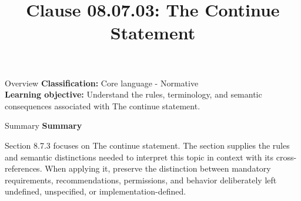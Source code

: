 \documentclass[10pt,letterpaper]{article}
\title{Clause 08.07.03: The Continue Statement}
\author{}
\date{}
\begin{document}
\maketitle
\begin{CornellOverviewBox}{Overview}
\textbf{Classification:} Core language - Normative\\[2pt]
\textbf{Learning objective:} Understand the rules, terminology, and semantic consequences associated with The continue statement.
\end{CornellOverviewBox}\begin{CornellSummaryBox}{Summary}
{\sffamily\bfseries\color{Accent} Summary}\par\vspace{3pt}Section 8.7.3 focuses on The continue statement. The section supplies the rules and semantic distinctions needed to interpret this topic in context with its cross-references. When applying it, preserve the distinction between mandatory requirements, recommendations, permissions, and behavior deliberately left undefined, unspecified, or implementation-defined.
\end{CornellSummaryBox}
\end{document}

